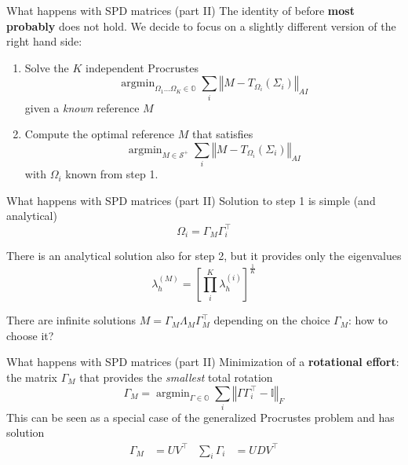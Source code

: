 \documentclass[xcolor=dvipsnames,aspectratio=169]{beamer}
\newcommand{\alerted}[1]{\alert{\bfseries #1}}
\DeclareMathOperator*{\argmin}{argmin}
\newcommand{\norm}[2][]{\left\Vert#2\right\Vert_{#1}}
\begin{document}
    \begin{frame}[t]{What happens with SPD matrices (part II)}
        The identity of before \alerted{most probably} does not hold. We decide to focus on a slightly different version of the right hand side:
        \begin{enumerate}
            \item Solve the $K$ independent Procrustes
            \begin{equation*}
                \argmin_{\Omega_1\dots\Omega_K\in\mathbb{O}}\sum_i\norm[AI]{M - T_{\Omega_i}(\Sigma_i)}
            \end{equation*}
            given a \emph{known} reference $M$
            \pause\item Compute the optimal reference $M$ that satisfies
            \begin{equation*}
                \argmin_{M\in\mathcal{S}^+}\sum_i\norm[AI]{M - T_{\Omega_i}(\Sigma_i)}
            \end{equation*}
            with $\Omega_i$ known from step 1.
        \end{enumerate}
    \end{frame}

    \begin{frame}[t]{What happens with SPD matrices (part II)}
        Solution to step 1 is simple (and analytical)
        \begin{equation*}
            \Omega_i = \Gamma_M\Gamma_i^\intercal
        \end{equation*}

        \pause
        There is an analytical solution also for step 2, but it provides only the eigenvalues
        \begin{equation*}
            \lambda_h^{(M)} = \left[\prod_i^K\lambda_h^{(i)}\right]^{\frac{1}{K}}
        \end{equation*}

        \pause
        There are infinite solutions $M = \Gamma_M\Lambda_M\Gamma_M^\intercal$ depending on the choice $\Gamma_M$: how to choose it?
    \end{frame}

    \begin{frame}[t]{What happens with SPD matrices (part II)}
        Minimization of a \alerted{rotational effort}: the matrix $\Gamma_M$ that provides the \emph{smallest} total rotation
        \begin{equation*}
            \Gamma_M = \argmin_{\Gamma\in\mathbb{O}}\sum_i\norm[F]{\Gamma\Gamma_i^\intercal - \mathbb{I}}
        \end{equation*}
        This can be seen as a special case of the generalized Procrustes problem and has solution
        \begin{align*}
            \Gamma_M &= UV^\intercal &  \sum_i\Gamma_i &= UDV^\intercal
        \end{align*}
    \end{frame}
\end{document}
